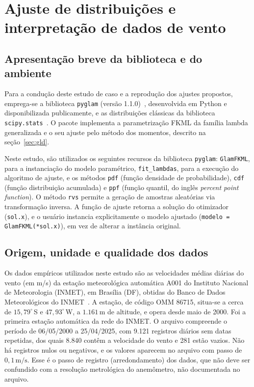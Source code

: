 \section{Ajuste de distribuições e interpretação de dados de vento}\label{sec:vento}

\subsection{Apresentação breve da biblioteca e do ambiente}

Para a condução deste estudo de caso e a reprodução dos ajustes propostos, emprega-se a biblioteca \texttt{pyglam} (versão 1.1.0)~\cite{pyglam}, desenvolvida em Python e disponibilizada publicamente, e as distribuições clássicas da biblioteca \texttt{scipy.stats}~\cite{scipy2020}. O pacote implementa a parametrização FKML da família lambda generalizada e o seu ajuste pelo método dos momentos, descrito na seção~\ref{sec:gld}.

Neste estudo, são utilizados os seguintes recursos da biblioteca \texttt{pyglam}: \texttt{GlamFKML}, para a instanciação do modelo paramétrico, \texttt{fit\_lambdas}, para a execução do algoritmo de ajuste, e os métodos \texttt{pdf} (função densidade de probabilidade), \texttt{cdf} (função distribuição acumulada) e \texttt{ppf} (função quantil, do inglês \textit{percent point function}). O método \texttt{rvs} permite a geração de amostras aleatórias via transformação inversa. A função de ajuste retorna a solução do otimizador (\texttt{sol.x}), e o usuário instancia explicitamente o modelo ajustado (\texttt{modelo = GlamFKML(*sol.x)}), em vez de alterar a instância original.

\subsection{Origem, unidade e qualidade dos dados}

Os dados empíricos utilizados neste estudo são as velocidades médias diárias do vento (em m/s) da estação meteorológica automática A001 do Instituto Nacional de Meteorologia (INMET), em Brasília (DF), obtidas do Banco de Dados Meteorológicos do INMET~\cite{inmet2025}. A estação, de código OMM 86715, situa-se a cerca de $15{,}79^\circ$\,S e $47{,}93^\circ$\,W, a $1.161$\,m de altitude, e opera desde maio de 2000. Foi a primeira estação automática da rede do INMET. O arquivo compreende o período de 06/05/2000 a 25/04/2025, com 9.121 registros diários sem datas repetidas, dos quais 8.840 contêm a velocidade do vento e 281 estão vazios. Não há registros nulos ou negativos, e os valores aparecem no arquivo com passo de $0,1\,\text{m/s}$. Esse é o passo de registro (arredondamento) dos dados, que não deve ser confundido com a resolução metrológica do anemômetro, não documentada no arquivo.

